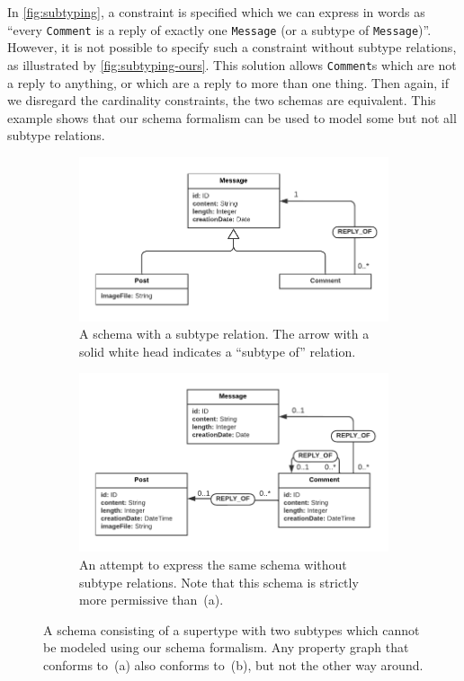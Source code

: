 \documentclass{report}
\theoremstyle{definition}
\begin{document}
In \autoref{fig:subtyping}, a constraint is specified which we can express in words as ``every \texttt{Comment} is a reply of exactly one \texttt{Message} (or a subtype of \texttt{Message})''. However, it is not possible to specify such a constraint without subtype relations, as illustrated by \autoref{fig:subtyping-ours}. This solution allows \texttt{Comment}s which are not a reply to anything, or which are a reply to more than one thing. Then again, if we disregard the cardinality constraints, the two schemas are equivalent. This example shows that our schema formalism can be used to model some but not all subtype relations.

\begin{figure}[t]
  \centering
  \begin{subfigure}[t]{0.45\textwidth}
    \centering
    \includegraphics[width=\textwidth]{figures/subtyping.pdf}
    \caption{A schema with a subtype relation. The arrow with a solid white head indicates a ``subtype of'' relation.}
    \label{fig:subtyping}
  \end{subfigure}
  \hfill
  \begin{subfigure}[t]{0.45\textwidth}
    \centering
    \includegraphics[width=\textwidth]{figures/subtyping-ours.pdf}
    \caption{An attempt to express the same schema without subtype relations. Note that this schema is strictly more permissive than~(a).}
    \label{fig:subtyping-ours}
  \end{subfigure}
  \caption[A schema containing subtype relations which cannot be modeled using our schema formalism]{A schema consisting of a supertype with two subtypes which cannot be modeled using our schema formalism. Any property graph that conforms to~(a) also conforms to~(b), but not the other way around.}
\end{figure}
\end{document}
